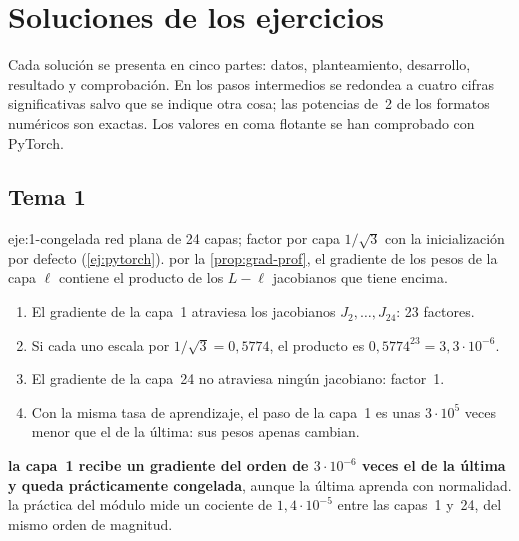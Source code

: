 \chapter{Soluciones de los ejercicios}
\label{ap:soluciones}

Cada solución se presenta en cinco partes: datos, planteamiento, desarrollo, resultado y comprobación. En los pasos intermedios se redondea a cuatro cifras significativas salvo que se indique otra cosa; las potencias de~2 de los formatos numéricos son exactas. Los valores en coma flotante se han comprobado con PyTorch.

\section{Tema 1}

\begin{solucion}{eje:1-congelada}
\datos red plana de 24 capas; factor por capa $1/\sqrt3$ con la inicialización por defecto (\cref{ej:pytorch}).
\planteamiento por la \cref{prop:grad-prof}, el gradiente de los pesos de la capa $\ell$ contiene el producto de los $L-\ell$ jacobianos que tiene encima.
\pasos
\begin{enumerate}[label=\arabic*.]
  \item El gradiente de la capa~1 atraviesa los jacobianos $J_2,\dots,J_{24}$: 23 factores.
  \item Si cada uno escala por $1/\sqrt3=0{,}5774$, el producto es $0{,}5774^{23}=3{,}3\cdot 10^{-6}$.
  \item El gradiente de la capa~24 no atraviesa ningún jacobiano: factor~1.
  \item Con la misma tasa de aprendizaje, el paso de la capa~1 es unas $3\cdot 10^{5}$ veces menor que el de la última: sus pesos apenas cambian.
\end{enumerate}
\resultado \textbf{la capa~1 recibe un gradiente del orden de $3\cdot 10^{-6}$ veces el de la última y queda prácticamente congelada}, aunque la última aprenda con normalidad.
\comprobacion la práctica del módulo mide un cociente de $1{,}4\cdot 10^{-5}$ entre las capas~1 y~24, del mismo orden de magnitud.
\end{solucion}

